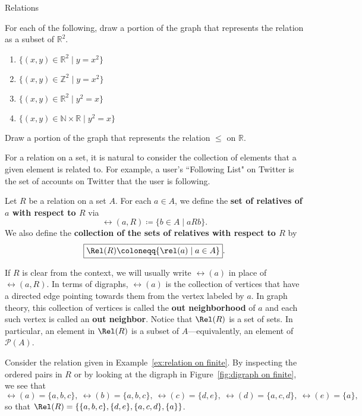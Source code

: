 \begin{section}{Relations}
\begin{problem}\label{prob:parabola}
For each of the following, draw a portion of the graph that represents the relation as a subset of $\mathbb{R}^2$.
\begin{enumerate}[label=\textrm{(\alph*)}]
\item $\{(x,y)\in \mathbb{R}^2 \mid y=x^2\}$
\item $\{(x,y)\in \mathbb{Z}^2 \mid y=x^2\}$
\item $\{(x,y)\in \mathbb{R}^2 \mid y^2=x\}$
\item $\{(x,y)\in \mathbb{N}\times \mathbb{R} \mid y^2=x\}$
\end{enumerate}
\end{problem}

\begin{problem}
Draw a portion of the graph that represents the relation $\leq$ on $\mathbb{R}$.
\end{problem}

For a relation on a set, it is natural to consider the collection of elements that a given element is related to.  For example, a user's ``Following List" on Twitter is the set of accounts on Twitter that the user is following. %

\begin{definition}\label{def:relatives}
Let $R$ be a relation on a set $A$. For each $a\in A$, we define the \textbf{set of relatives of $a$ with respect to $R$} via
\[
\boxed{\rel(a,R)\coloneqq \{b\in A\mid aR b\}}.
\]
We also define the \textbf{collection of the sets of relatives with respect to $R$} by
\[
\boxed{\Rel(R)\coloneqq \{\rel(a)\mid a\in A\}}.
\]
\end{definition}

If $R$ is clear from the context, we will usually write $\boxed{\rel(a)}$ in place of $\rel(a,R)$.  In terms of digraphs, $\rel(a)$ is the collection of vertices that have a directed edge pointing towards them from the vertex labeled by $a$. In graph theory, this collection of vertices is called the \textbf{out neighborhood} of $a$ and each such vertex is called an \textbf{out neighbor}. Notice that $\Rel(R)$ is a set of sets.  In particular, an element in $\Rel(R)$ is a subset of $A$---equivalently, an element of $\mathcal{P}(A)$.

\begin{example}
Consider the relation given in Example~\ref{ex:relation on finite}.  By inspecting the ordered pairs in $R$ or by looking at the digraph in Figure~\ref{fig:digraph on finite}, we see that
\[
\rel(a) = \{a,b,c\},\ \rel(b) = \{a,b,c\},\ \rel(c) = \{d,e\},\ \rel(d) = \{a,c,d\},\ \rel(e) = \{a\},
\]
so that $\Rel(R) = \{\{a,b,c\},\{d,e\},\{a,c,d\},\{a\}\}$.
\end{example}


\end{section}
